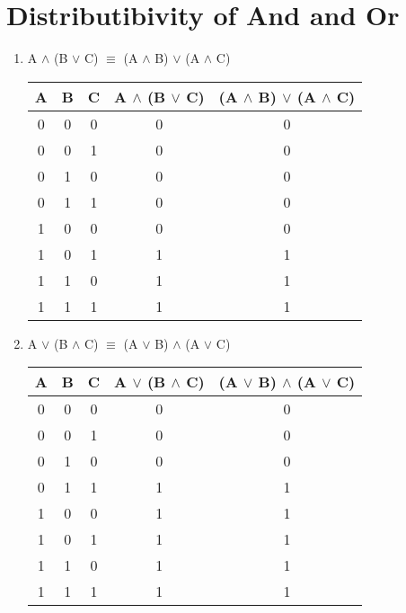 \documentclass{report}
\begin{document}
\section{Distributibivity of And and Or}
\begin{enumerate}

  \item A $\land$ (B $\lor$ C) $\equiv$ (A $\land$ B) $\lor$ (A $\land$ C)

\begin{center}
  \begin{tabular}{| c | c | c | c | c |}
    \hline
    A & B & C & A $\land$ (B $\lor$ C) & (A $\land$ B) $\lor$ (A $\land$ C) \\ \hline
    0 & 0 & 0 & 0 & 0 \\
    0 & 0 & 1 & 0 & 0 \\
    0 & 1 & 0 & 0 & 0 \\
    0 & 1 & 1 & 0 & 0 \\
    1 & 0 & 0 & 0 & 0 \\
    1 & 0 & 1 & 1 & 1 \\
    1 & 1 & 0 & 1 & 1 \\
    1 & 1 & 1 & 1 & 1 \\ \hline
  \end{tabular}
\end{center}

  \item A $\lor$ (B $\land$ C) $\equiv$ (A $\lor$ B) $\land$ (A $\lor$ C)

\begin{center}
  \begin{tabular}{| c | c | c | c | c |}
    \hline
    A & B & C & A $\lor$ (B $\land$ C) & (A $\lor$ B) $\land$ (A $\lor$ C) \\ \hline
    0 & 0 & 0 & 0 & 0 \\
    0 & 0 & 1 & 0 & 0 \\
    0 & 1 & 0 & 0 & 0 \\
    0 & 1 & 1 & 1 & 1 \\
    1 & 0 & 0 & 1 & 1 \\
    1 & 0 & 1 & 1 & 1 \\
    1 & 1 & 0 & 1 & 1 \\
    1 & 1 & 1 & 1 & 1 \\ \hline
  \end{tabular}
\end{center}
\end{enumerate}

\end{document}
